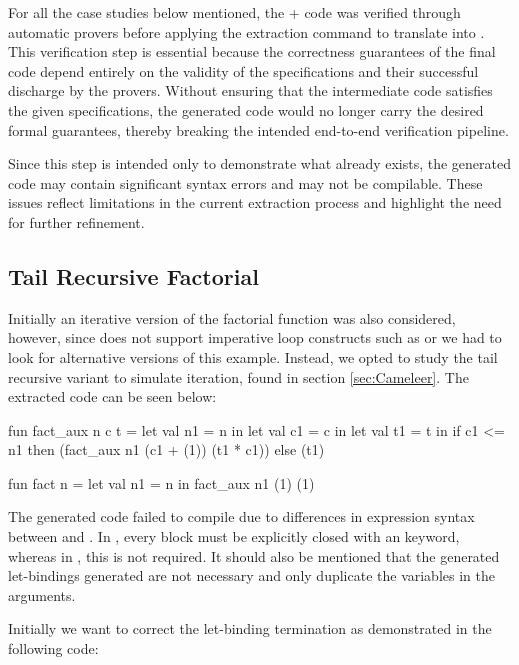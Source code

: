 For all the case studies below mentioned, the \ocaml + \gospel code was verified through \whythree automatic
provers before applying the extraction command to translate into \cml. This verification step is essential because the correctness 
guarantees of the final \cml code depend entirely on the validity of the specifications and their successful discharge by the 
provers. Without ensuring that the \whyml intermediate code satisfies the given specifications, the generated \cml code would 
no longer carry the desired formal guarantees, thereby breaking the intended end-to-end verification pipeline.

Since this step is intended only to demonstrate what already exists, the generated code may contain significant syntax errors 
and may not be compilable. These issues reflect limitations in the current extraction process and highlight the need for 
further refinement.

\subsection{Tail Recursive Factorial}

Initially an iterative version of the factorial function was also considered, however, since \cml does not support imperative loop 
constructs such as  or  we had to look for alternative versions of this example. Instead, we opted 
to study the tail recursive variant to simulate iteration, found in section \ref{sec:Cameleer}. The extracted code can be seen below:

\begin{cakeml}
fun fact_aux n c t = let val n1 = n in
  let val c1 = c in
  let val t1 = t in
  if c1 <= n1 then (fact_aux n1 (c1 + (1)) (t1 * c1))  else (t1)

fun fact n = let val n1 = n in fact_aux n1 (1) (1)
\end{cakeml}

The generated \cml code failed to compile due to differences in  expression syntax between \ocaml and \cml. In \cml, every 
 block must be explicitly closed with an  keyword, whereas in \ocaml, this is not required. It should
also be mentioned that the generated let-bindings generated are not necessary and only duplicate the variables in the arguments.

Initially we want to correct the let-binding termination as demonstrated in the following code:

